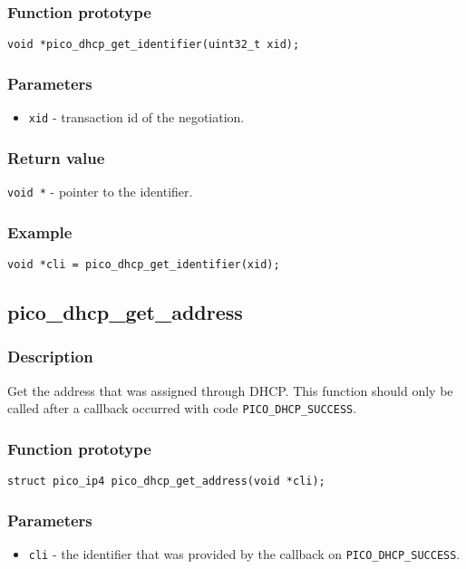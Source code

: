 \subsubsection*{Function prototype}
\texttt{void *pico\_dhcp\_get\_identifier(uint32\_t xid);}

\subsubsection*{Parameters}
\begin{itemize}[noitemsep]
\item \texttt{xid} - transaction id of the negotiation.
\end{itemize}

\subsubsection*{Return value}
\texttt{void *} - pointer to the identifier.


\subsubsection*{Example}
\begin{verbatim}
void *cli = pico_dhcp_get_identifier(xid);
\end{verbatim}


\subsection{pico\_dhcp\_get\_address}

\subsubsection*{Description}
Get the address that was assigned through DHCP. This function should only be called after a callback occurred with code \texttt{PICO\_DHCP\_SUCCESS}. 

\subsubsection*{Function prototype}
\texttt{struct pico\_ip4 pico\_dhcp\_get\_address(void *cli);}

\subsubsection*{Parameters}
\begin{itemize}[noitemsep]
\item \texttt{cli} - the identifier that was provided by the callback on \texttt{PICO\_DHCP\_SUCCESS}.
\end{itemize}

